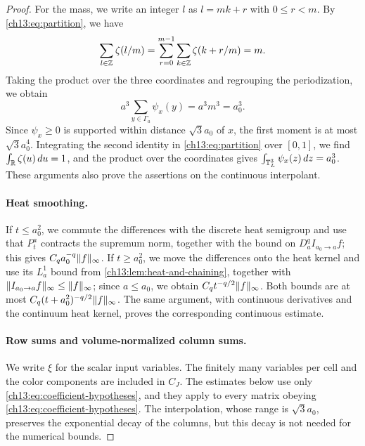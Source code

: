 \begin{proof}
For the mass, we write an integer $l$ as $l=mk+r$ with $0\le r<m$. By \eqref{ch13:eq:partition}, we have
\[
 \sum_{l\in\mathbb Z}\zeta(l/m)=\sum_{r=0}^{m-1}\sum_{k\in\mathbb Z}\zeta(k+r/m)=m.
\]
Taking the product over the three coordinates and regrouping the periodization, we obtain
\begin{equation}\label{ch13:eq:exact-cardinal-mass}
 a^3\sum_{y\in\Gamma_a}\psi_x(y)=a^3m^3=a_0^3.
\end{equation}
Since $\psi_x\ge0$ is supported within distance $\sqrt3a_0$ of $x$, the first moment is at most $\sqrt3a_0^4$. Integrating the second identity in \eqref{ch13:eq:partition} over $[0,1]$, we find $\int_\mathbb R\zeta(u)\,du=1$, and the product over the coordinates gives $\int_{\mathbb T_L^3}\psi_x(z)\,dz=a_0^3$. These arguments also prove the assertions on the continuous interpolant.

\paragraph{Heat smoothing.}
If $t\le a_0^2$, we commute the differences with the discrete heat semigroup and use that $P_t^a$ contracts the supremum norm, together with the bound on $D_a^qI_{a_0\to a}f$; this gives $C_qa_0^{-q}\lVert f\rVert_\infty$. If $t\ge a_0^2$, we move the differences onto the heat kernel and use its $L^1_a$ bound from \cref{ch13:lem:heat-and-chaining}, together with $\lVert I_{a_0\to a}f\rVert_\infty\le\lVert f\rVert_\infty$; since $a\le a_0$, we obtain $C_qt^{-q/2}\lVert f\rVert_\infty$. Both bounds are at most $C_q(t+a_0^2)^{-q/2}\lVert f\rVert_\infty$. The same argument, with continuous derivatives and the continuum heat kernel, proves the corresponding continuous estimate.

\paragraph{Row sums and volume-normalized column sums.}
We write $\xi$ for the scalar input variables. The finitely many variables per cell and the color components are included in $C_J$. The estimates below use only \eqref{ch13:eq:coefficient-hypotheses}, and they apply to every matrix obeying \eqref{ch13:eq:coefficient-hypotheses}. The interpolation, whose range is $\sqrt3a_0$, preserves the exponential decay of the columns, but this decay is not needed for the numerical bounds.


\end{proof}
